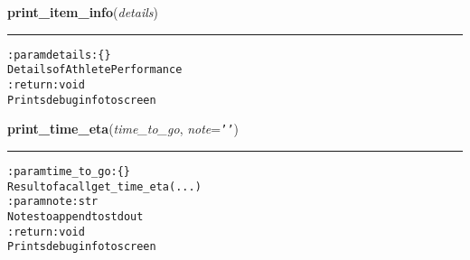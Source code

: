     \label{hal:time:profile:print_item_info}

    \vspace{0.5ex}

\hspace{.8\funcindent}\begin{boxedminipage}{\funcwidth}

    \raggedright \textbf{print\_item\_info}(\textit{details})

    \vspace{-1.5ex}

    \rule{\textwidth}{0.5\fboxrule}
\setlength{\parskip}{2ex}
\begin{alltt}

:param details: \{\}
    Details of AthletePerformance
:return: void
    Prints debug info to screen
\end{alltt}

\setlength{\parskip}{1ex}
    \end{boxedminipage}

    \label{hal:time:profile:print_time_eta}

    \vspace{0.5ex}

\hspace{.8\funcindent}\begin{boxedminipage}{\funcwidth}

    \raggedright \textbf{print\_time\_eta}(\textit{time\_to\_go}, \textit{note}={\tt \texttt{'}\texttt{}\texttt{'}})

    \vspace{-1.5ex}

    \rule{\textwidth}{0.5\fboxrule}
\setlength{\parskip}{2ex}
\begin{alltt}

:param time\_to\_go: \{\}
    Result of a call get\_time\_eta(...)
:param note: str
    Notes to append to stdout
:return: void
    Prints debug info to screen
\end{alltt}

\setlength{\parskip}{1ex}
    \end{boxedminipage}



